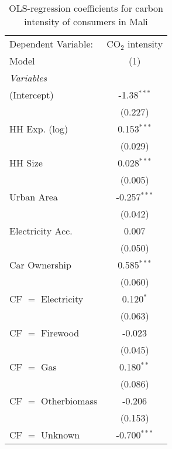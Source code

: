 
\begin{table}[htbp!]
   \centering
   \small
   \begin{adjustbox}{width = 1\textwidth, max height = 0.95\textheight, center}
      \begin{threeparttable}[b]
         \caption{\label{tab:OLS_1_MLI} OLS-regression coefficients for carbon intensity of consumers in Mali}
         \begin{tabular}{lc}
            \tabularnewline \midrule \midrule
            Dependent Variable: & CO$_{2}$ intensity\\  
            Model               & (1)\\  
            \midrule
            \emph{Variables}\\
            (Intercept)         & -1.38$^{***}$\\   
                                & (0.227)\\   
            HH Exp. (log)       & 0.153$^{***}$\\   
                                & (0.029)\\   
            HH Size             & 0.028$^{***}$\\   
                                & (0.005)\\   
            Urban Area          & -0.257$^{***}$\\   
                                & (0.042)\\   
            Electricity Acc.    & 0.007\\   
                                & (0.050)\\   
            Car Ownership       & 0.585$^{***}$\\   
                                & (0.060)\\   
            CF $=$ Electricity  & 0.120$^{*}$\\   
                                & (0.063)\\   
            CF $=$ Firewood     & -0.023\\   
                                & (0.045)\\   
            CF $=$ Gas          & 0.180$^{**}$\\   
                                & (0.086)\\   
            CF $=$ Otherbiomass & -0.206\\   
                                & (0.153)\\   
            CF $=$ Unknown      & -0.700$^{***}$\\   

\end{tabular}
\end{threeparttable}
\end{adjustbox}
\end{table}
